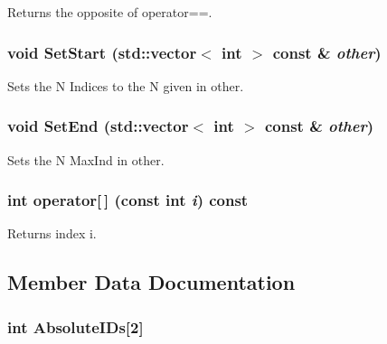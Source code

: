 Returns the opposite of operator==. \hypertarget{classJKBuilder_1_1Iterator_aa83de505e29125c1d3ac7bb1b13ca15a}{
\subsubsection[{SetStart}]{\setlength{\rightskip}{0pt plus 5cm}void SetStart (std::vector$<$ int $>$ const \& {\em other})}}
\label{classJKBuilder_1_1Iterator_aa83de505e29125c1d3ac7bb1b13ca15a}


Sets the N Indices to the N given in other. \hypertarget{classJKBuilder_1_1Iterator_aad84ec668b5f41210db34c540aaa31fc}{
\subsubsection[{SetEnd}]{\setlength{\rightskip}{0pt plus 5cm}void SetEnd (std::vector$<$ int $>$ const \& {\em other})}}
\label{classJKBuilder_1_1Iterator_aad84ec668b5f41210db34c540aaa31fc}


Sets the N MaxInd in other. \hypertarget{classJKBuilder_1_1Iterator_a74247cf730a06b23fcb1ec64e5596b25}{
\subsubsection[{operator[]}]{\setlength{\rightskip}{0pt plus 5cm}int operator\mbox{[}$\,$\mbox{]} (const int {\em i}) const}}
\label{classJKBuilder_1_1Iterator_a74247cf730a06b23fcb1ec64e5596b25}


Returns index i. 

\subsection{Member Data Documentation}
\hypertarget{classJKBuilder_1_1PairIterator_a5c96d22e39dea8044c7caf8c1213e813}{
\subsubsection[{AbsoluteIDs}]{\setlength{\rightskip}{0pt plus 5cm}int {\bf AbsoluteIDs}\mbox{[}2\mbox{]}}}
\label{classJKBuilder_1_1PairIterator_a5c96d22e39dea8044c7caf8c1213e813}


